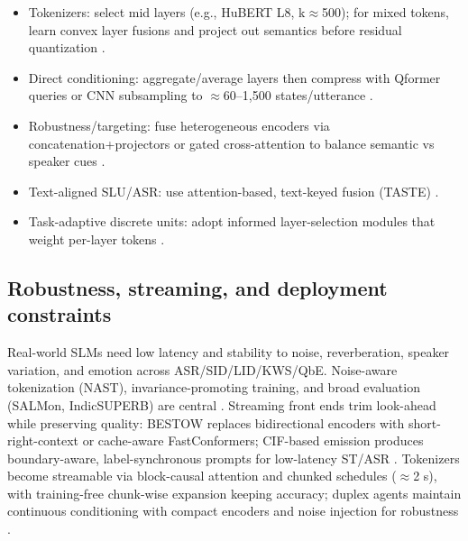 \documentclass{article}
\begin{document}
\begin{itemize}
  \item Tokenizers: select mid layers (e.g., HuBERT L8, k$\approx$500); for mixed tokens, learn convex layer fusions and project out semantics before residual quantization \cite{hussein2025hasrdhierarchicalacousticsemanticreprese,chen2023reducingbarriersselfsupervisedlearninghu}.
  \item Direct conditioning: aggregate/average layers then compress with Qformer queries or CNN subsampling to $\approx$60--1{,}500 states/utterance \cite{lu2024destaenhancingspeechlanguagemodelsthroug}.
  \item Robustness/targeting: fuse heterogeneous encoders via concatenation+projectors or gated cross-attention to balance semantic vs speaker cues \cite{mei2025shnumultilingualconversationalspeechreco,lin2025dkusystemmultispeakerautomaticspeechreco}.
  \item Text-aligned SLU/ASR: use attention-based, text-keyed fusion (TASTE) \cite{tseng2025tastetextalignedspeechtokenizationembedd}.
  \item Task-adaptive discrete units: adopt informed layer-selection modules that weight per-layer tokens \cite{mousavi2024howshouldweextractdiscreteaudiotokenssel}.
\end{itemize}

\subsection{Robustness, streaming, and deployment constraints} \label{subsec:Robustness, streaming, and deployment constraints}
Real-world SLMs need low latency and stability to noise, reverberation, speaker variation, and emotion across ASR/SID/LID/KWS/QbE. Noise-aware tokenization (NAST), invariance-promoting training, and broad evaluation (SALMon, IndicSUPERB) are central \cite{messica2024nastnoiseawarespeechtokenizationlanguage,maimon2025salmonsuiteacousticlanguagemodelevaluati,entry2025indicsuperbspeechprocessinguniversalperf}. Streaming front ends trim look-ahead while preserving quality: BESTOW replaces bidirectional encoders with short-right-context or cache-aware FastConformers; CIF-based emission produces boundary-aware, label-synchronous prompts for low-latency ST/ASR \cite{chen2024bestowefficientstreamablespeechlanguagem,deng2025simuls2sllmunlockingsimultaneousinferenc}. Tokenizers become streamable via block-causal attention and chunked schedules ($\approx$2 s), with training-free chunk-wise expansion keeping accuracy; duplex agents maintain continuous conditioning with compact encoders and noise injection for robustness \cite{zeng2024scalingspeechtextpretrainingsyntheticint,chang2024dcspinspeakerinvariantspeechtokenizerspo,ma2024languagemodelcanlistenwhilespeaking}.
\end{document}
